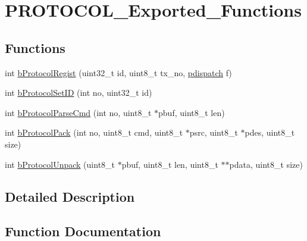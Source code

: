 \hypertarget{group___p_r_o_t_o_c_o_l___exported___functions}{}\section{P\+R\+O\+T\+O\+C\+O\+L\+\_\+\+Exported\+\_\+\+Functions}
\label{group___p_r_o_t_o_c_o_l___exported___functions}
\subsection*{Functions}
\begin{DoxyCompactItemize}
\item 
int \mbox{\hyperlink{group___p_r_o_t_o_c_o_l___exported___functions_ga042c82b5764c60b4078866635c8e8c7b}{b\+Protocol\+Regist}} (uint32\+\_\+t id, uint8\+\_\+t tx\+\_\+no, \mbox{\hyperlink{group___p_r_o_t_o_c_o_l___exported___types_definitions_ga385520b45d23dc3a4dde23de92b85c75}{pdispatch}} f)
\item 
int \mbox{\hyperlink{group___p_r_o_t_o_c_o_l___exported___functions_gadcb3551dcf55a58973810c4f348ffb0d}{b\+Protocol\+Set\+ID}} (int no, uint32\+\_\+t id)
\item 
int \mbox{\hyperlink{group___p_r_o_t_o_c_o_l___exported___functions_ga201cb6ee4bc47d6551d221c631490300}{b\+Protocol\+Parse\+Cmd}} (int no, uint8\+\_\+t $\ast$pbuf, uint8\+\_\+t len)
\item 
int \mbox{\hyperlink{group___p_r_o_t_o_c_o_l___exported___functions_ga52abd16bc752d1f1eb42ac3b0677d60a}{b\+Protocol\+Pack}} (int no, uint8\+\_\+t cmd, uint8\+\_\+t $\ast$psrc, uint8\+\_\+t $\ast$pdes, uint8\+\_\+t size)
\item 
int \mbox{\hyperlink{group___p_r_o_t_o_c_o_l___exported___functions_gaa2f6a6a163f48963d802b9f6964f348c}{b\+Protocol\+Unpack}} (uint8\+\_\+t $\ast$pbuf, uint8\+\_\+t len, uint8\+\_\+t $\ast$$\ast$pdata, uint8\+\_\+t size)
\end{DoxyCompactItemize}


\subsection{Detailed Description}


\subsection{Function Documentation}
\mbox{\label{group___p_r_o_t_o_c_o_l___exported___functions_ga52abd16bc752d1f1eb42ac3b0677d60a}} 
